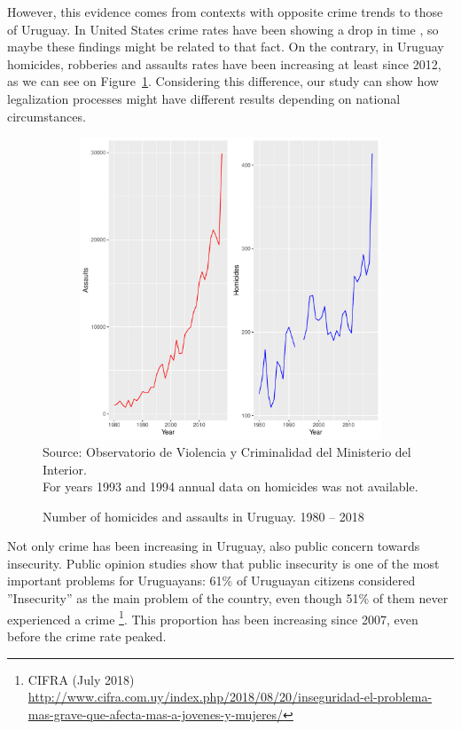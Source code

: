\documentclass[11pt]{article}
\begin{document}
However, this evidence comes from contexts with opposite crime trends to those of Uruguay. In United States crime rates have been showing a drop in time \citep{gramlich5facts, james2018recent}, so maybe these findings might be related to that fact. On the contrary, in Uruguay homicides, robberies and assaults rates have been increasing at least since 2012, as we can see on Figure~\ref{fig:homrap19802017}. Considering this difference, our study can show how legalization processes might have different results depending on national circumstances.

\begin{figure}[H]
	\centering
	\caption{Number of homicides and assaults in Uruguay. 1980 -- 2018}
	\label{fig:homrap19802017}
	\includegraphics[width=15cm, height=9cm]{evo_delitos.pdf}
	\\
    \scriptsize{Source: Observatorio de Violencia y Criminalidad del Ministerio del Interior. \\ For years 1993 and 1994 annual data on homicides was not available.}
\end{figure}

Not only crime has been increasing in Uruguay, also public concern towards insecurity. Public opinion studies show that public insecurity is one of the most important problems for Uruguayans: 61\% of Uruguayan citizens considered ''Insecurity'' as the main problem of the country, even though 51\% of them never experienced a crime \footnote{CIFRA (July 2018) \url{http://www.cifra.com.uy/index.php/2018/08/20/inseguridad-el-problema-mas-grave-que-afecta-mas-a-jovenes-y-mujeres/}}. This proportion has been increasing since 2007, even before the crime rate peaked.
\end{document}

